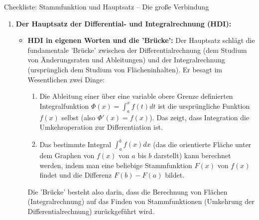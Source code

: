 \begin{loesungsumgebung}{Checkliste: Stammfunktion und Hauptsatz – Die große Verbindung}
\begin{enumerate}[label=(\alph*)]
\begin{itemize}
        \item \textbf{Ist $F(x) \cdot G(x)$ eine Stammfunktion von $f(x) \cdot g(x)$?}
        Die Vermutung ist: \textbf{Nein}, im Allgemeinen nicht.
        Zur Überprüfung leiten wir $F(x) \cdot G(x)$ mit der Produktregel ab:
        $(F(x) \cdot G(x))' = F'(x) \cdot G(x) + F(x) \cdot G'(x)$.
        Da $F'(x)=f(x)$ und $G'(x)=g(x)$, erhalten wir:
        $(F(x) \cdot G(x))' = f(x)G(x) + F(x)g(x)$.
        Dies ist im Allgemeinen nicht gleich $f(x)g(x)$.
        \textit{Beispiel:} Sei $f(x)=1$ und $g(x)=2x$.
        Dann ist eine Stammfunktion $F(x)=x$ und eine Stammfunktion $G(x)=x^2$.
        Das Produkt der Funktionen ist $f(x)g(x) = 1 \cdot 2x = 2x$.
        Das Produkt der Stammfunktionen ist $F(x)G(x) = x \cdot x^2 = x^3$.
        Die Ableitung von $F(x)G(x)$ ist $(x^3)' = 3x^2$.
        Da $3x^2 \neq 2x$ (außer für spezielle $x$), ist $F(x)G(x)$ keine Stammfunktion von $f(x)g(x)$.
        \textit{Schlussfolgerung:} Es gibt keine einfache 'Produktregel' für die Integration in der Form $\int f(x)g(x)dx = (\int f(x)dx)(\int g(x)dx)$. Methoden wie die partielle Integration werden für das Integrieren von Produkten benötigt.
    \end{itemize}

    \item \textbf{Der Hauptsatz der Differential- und Integralrechnung (HDI):}
    \begin{itemize}
        \item \textbf{HDI in eigenen Worten und die 'Brücke':}
        Der Hauptsatz schlägt die fundamentale 'Brücke' zwischen der Differentialrechnung (dem Studium von Änderungsraten und Ableitungen) und der Integralrechnung (ursprünglich dem Studium von Flächeninhalten). Er besagt im Wesentlichen zwei Dinge:
        \begin{enumerate}
            \item Die Ableitung einer über eine variable obere Grenze definierten Integralfunktion $\Phi(x) = \int_a^x f(t)dt$ ist die ursprüngliche Funktion $f(x)$ selbst (also $\Phi'(x) = f(x)$). Das zeigt, dass Integration die Umkehroperation zur Differentiation ist.
            \item Das bestimmte Integral $\int_a^b f(x)dx$ (das die orientierte Fläche unter dem Graphen von $f(x)$ von $a$ bis $b$ darstellt) kann berechnet werden, indem man eine beliebige Stammfunktion $F(x)$ von $f(x)$ findet und die Differenz $F(b) - F(a)$ bildet.
        \end{enumerate}
        Die 'Brücke' besteht also darin, dass die Berechnung von Flächen (Integralrechnung) auf das Finden von Stammfunktionen (Umkehrung der Differentialrechnung) zurückgeführt wird.


\end{itemize}
\end{enumerate}
\end{loesungsumgebung}
